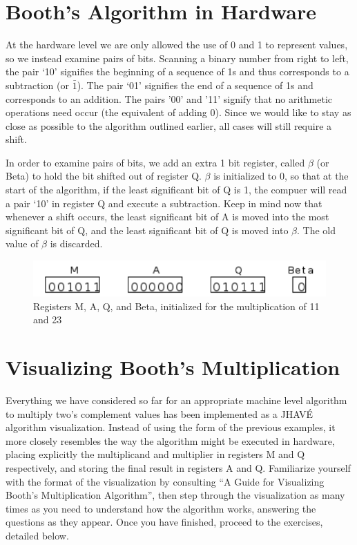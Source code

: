 \documentclass{article}
\begin{document}
\section{Booth's Algorithm in Hardware}
    At the hardware level we are only allowed the use of 0 and 1 to represent values, so we instead examine pairs of bits.
Scanning a binary number from right to left, the pair `10' signifies the beginning of a sequence of 1s and thus corresponds to a subtraction (or $\bar{1}$).
The pair `01' signifies the end of a sequence of 1s and corresponds to an addition.
The pairs '00' and '11' signify that no arithmetic operations need occur (the equivalent of adding 0).
Since we would like to stay as close as possible to the algorithm outlined earlier, all cases will still require a shift.

    In order to examine pairs of bits, we add an extra 1 bit register, called $\beta$ (or Beta) to hold the bit shifted out of register Q.
$\beta$ is initialized to 0, so that at the start of the algorithm, if the least significant bit of Q is 1, the compuer will read a pair `10' in register Q and execute a subtraction.
Keep in mind now that whenever a shift occurs, the least significant bit of A is moved into the most significant bit of Q, and the least significant bit of Q is moved into $\beta$.
The old value of $\beta$ is discarded.

\begin{figure}[h]
\centering
\includegraphics{init2.pdf}
\caption{Registers M, A, Q, and Beta, initialized for the multiplication of 11 and 23}
\end{figure}

\section{Visualizing Booth's Multiplication}
Everything we have considered so far for an appropriate machine level algorithm to multiply two's complement values has been implemented as a JHAVÉ algorithm visualization.
Instead of using the form of the previous examples, it more closely resembles the way the algorithm might be executed in hardware, placing explicitly the multiplicand and multiplier in registers M and Q respectively, and storing the final result in registers A and Q.
Familiarize yourself with the format of the visualization by consulting ``A Guide for Visualizing Booth’s Multiplication Algorithm'', then step through the visualization as many times as you need to understand how the algorithm works, answering the questions as they appear.
Once you have finished, proceed to the exercises, detailed below.
\end{document}
